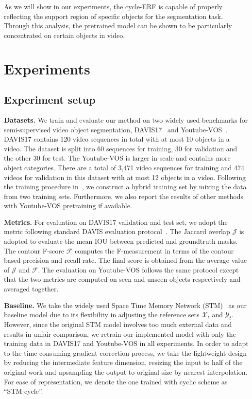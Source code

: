 \documentclass{article}
\begin{document}
As we will show in our experiments, the cycle-ERF is capable of properly reflecting the support region of specific objects for the segmentation task. Through this analysis, the pretrained model can be shown to be particularly concentrated on certain objects in video. 


\section{Experiments}

\subsection{Experiment setup}
\textbf{Datasets.} We train and evaluate our method on two widely used benchmarks for semi-supervised video object segmentation, DAVIS17~\cite{Pont-Tuset_arXiv_2017} and Youtube-VOS~\cite{Xu_2018_S2S_ECCV}. DAVIS17 contains 120 video sequences in total with at most 10 objects in a video. The dataset is split into 60 sequences for training, 30 for validation and the other 30 for test. The Youtube-VOS is larger in scale and contains more object categories. There are a total of 3,471 video sequences for training and 474 videos for validation in this dataset with at most 12 objects in a video. Following the training procedure in~\cite{Oh_2019_ICCV,Voigtlaender_2019_CVPR}, we construct a hybrid training set by mixing the data from two training sets. Furthermore, we also report the results of other methods with Youtube-VOS pretraining if available.

\textbf{Metrics.} For evaluation on DAVIS17 validation and test set, we adopt the metric following standard DAVIS evaluation protocol~\cite{Pont-Tuset_arXiv_2017}. The Jaccard overlap $\mathcal{J}$ is adopted to evaluate the mean IOU between predicted and groundtruth masks. The contour F-score $\mathcal{F}$ computes the F-measurement in terms of the contour based precision and recall rate. The final score is obtained from the average value of $\mathcal{J}$ and $\mathcal{F}$. The evaluation on Youtube-VOS follows the same protocol except that the two metrics are computed on seen and unseen objects respectively and averaged together.

\textbf{Baseline.} We take the widely used Space Time Memory Network (STM)~\cite{Oh_2019_ICCV} as our baseline model due to its flexibility in adjusting the reference sets $\mathcal{X}_t$ and $\mathcal{Y}_t$. However, since the original STM model involves too much external data and results in unfair comparison, we retrain our implemented model with only the training data in DAVIS17 and Youtube-VOS in all experiments. In order to adapt to the time-consuming gradient correction process, we take the lightweight design by reducing the intermediate feature dimension, resizing the input to half of the original work and upsampling the output to original size by nearest interpolation. For ease of representation, we denote the one trained with cyclic scheme as ``STM-cycle''.
\end{document}
